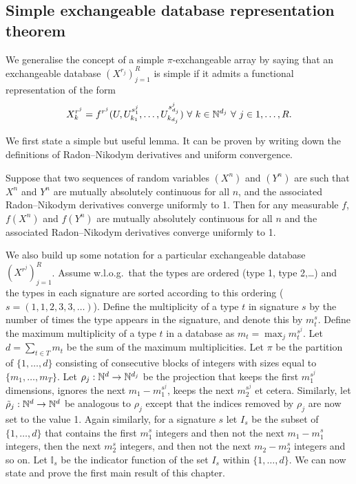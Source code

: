 \subsection{Simple exchangeable database representation theorem}

We generalise the concept of a simple $\pi$-exchangeable array by saying that an exchangeable database $(X^{r_j})_{j=1}^R$ is simple if it admits a functional representation of the form
\begin{equation}
  X^{r^j}_{k} = f^{r^j}(U, U^{s^{j}_1}_{k_1},\dots,U^{s^{j}_{d_j}}_{k_{d_j}}) \,\, \forall \,\, k \in \mathbb{N}^{d_j} \,\, \forall \,\, j \in {1,\dots,R}.
\end{equation}

We first state a simple but useful lemma.
It can be proven by writing down the definitions of Radon--Nikodym derivatives and uniform convergence.

\begin{lem}
  \label{lem:contractionrnd}
  Suppose that two sequences of random variables $(X^n)$ and $(Y^n)$ are such that $X^n$ and $Y^n$ are mutually absolutely continuous for all $n$, and the associated Radon--Nikodym derivatives converge uniformly to 1.
  Then for any measurable $f$, $f(X^n)$ and $f(Y^n)$ are mutually absolutely continuous for all $n$ and the associated Radon--Nikodym derivatives converge uniformly to 1.
\end{lem}

We also build up some notation for a particular exchangeable database $(X^{r^j})_{j=1}^R$.%
Assume w.l.o.g.\ that the types are ordered (\eg type 1, type 2,\dots) and the types in each signature are sorted according to this ordering (\eg $s = (1,1,2,3,3,\dots)$).
Define the multiplicity of a type $t$ in signature $s$ by the number of times the type appears in the signature, and denote this by $m_{t}^s$.
Define the maximum multiplicity of a type $t$ in a database as $m_t = \max_j m_t^{s^j}$.
Let $d = \sum_{t\in T} m_t$ be the sum of the maximum multiplicities.
Let $\pi$ be the partition of $\{1,\ldots,d\}$ consisting of consecutive blocks of integers with sizes equal to $\{m_1,\ldots,m_T\}$.
Let $\rho_j : \mathbb{N}^d \to \mathbb{N}^{d_j}$ be the projection that keeps the first $m_{1}^{s^j}$ dimensions, ignores the next $m_1 - m_{1}^{s^j}$, keeps the next $m_{2}^{s^j}$ et cetera.
Similarly, let $\tilde{\rho}_j : \mathbb{N}^d \to \mathbb{N}^d$ be analogous to $\rho_j$ except that the indices removed by $\rho_j$ are now set to the value 1.
Again similarly, for a signature $s$ let $I_s$ be the subset of $\{1,\ldots,d\}$ that contains the first $m_1^s$ integers and then not the next $m_1 - m_1^s$ integers, then the next $m_2^s$ integers, and then not the next $m_2 - m_2^s$ integers and so on.
Let $\mathbb{I}_s$ be the indicator function of the set $I_s$ within $\{1,\ldots,d\}$.
We can now state and prove the first main result of this chapter.

